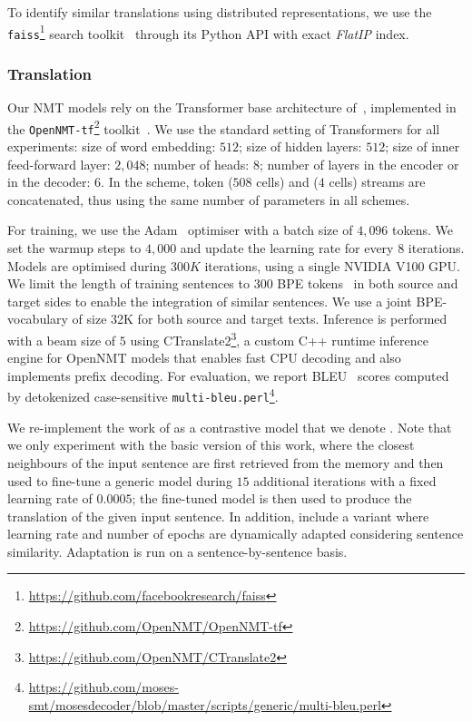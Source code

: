 To identify similar translations using distributed representations, we use the \texttt{faiss}\footnote{\url{https://github.com/facebookresearch/faiss}} search toolkit~\cite{Johnson19billion} through its Python API with exact \textit{FlatIP} index. 

\subsubsection*{Translation}

Our NMT models rely on the Transformer base architecture of~\citet{Vaswani17attention}, implemented in the \texttt{OpenNMT-tf}\footnote{\url{https://github.com/OpenNMT/OpenNMT-tf}} toolkit~\cite{Klein17opennmt}.
%
We use the standard setting of Transformers for all experiments: size of word embedding: $512$; size of hidden layers: $512$; size of inner feed-forward layer: $2,048$; number of heads: $8$; number of layers in the encoder or in the decoder: $6$. In the  scheme, 
token ($508$ cells) and  ($4$ cells) streams are concatenated, thus using the same number of parameters in all schemes.

For training, we use the Adam~\cite{Kingma15adam} optimiser with a batch size of $4,096$ tokens. We set the warmup steps to $4,000$ and update the learning rate for every $8$ iterations. Models are optimised during $300K$ iterations, using a single NVIDIA V100 GPU.
%
We limit the length of training sentences to $300$ BPE tokens~\cite{Sennrich16neural} in both source and target sides to enable the integration of similar sentences. We use a joint BPE-vocabulary of size 32K for both source and target texts. Inference is performed with a beam size of $5$ using CTranslate2\footnote{\url{https://github.com/OpenNMT/CTranslate2}}, a custom C++ runtime inference engine for OpenNMT models that enables fast CPU decoding and also implements prefix decoding.
For evaluation, we report BLEU~\cite{Papineni02bleu} scores computed by detokenized case-sensitive \texttt{multi-bleu.perl}\footnote{\url{https://github.com/moses-smt/mosesdecoder/blob/master/scripts/generic/multi-bleu.perl}}.

We re-implement the work of \citet{Farajian17multidomain} as a contrastive model that we denote . Note that we only experiment with the basic version of this work, where the closest neighbours of the input sentence are first retrieved from the memory and then used to fine-tune a generic model during $15$ additional iterations with a fixed learning rate of $0.0005$; the fine-tuned model is then used to produce the translation of the given input sentence. In addition, \citet{Farajian17multidomain} include a variant where learning rate and number of epochs are dynamically adapted considering sentence similarity.
Adaptation is run on a sentence-by-sentence basis.

